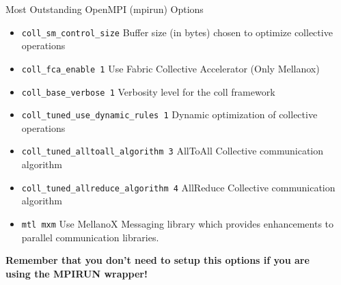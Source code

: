 \documentclass[final,t]{beamer}
\begin{document}
\begin{frame}[fragile]{}
\begin{columns}[t]
\begin{column}{.35\linewidth}
\begin{block}{Most Outstanding OpenMPI (mpirun) Options}
\begin{itemize}
\begin{itemize}
         \item \verb|coll_sm_control_size| Buffer size (in bytes) chosen to optimize collective operations
         \item \verb|coll_fca_enable 1| Use Fabric Collective Accelerator (Only Mellanox)
         \item \verb|coll_base_verbose 1| Verbosity level for the coll framework
         \item \verb|coll_tuned_use_dynamic_rules 1| Dynamic optimization of collective operations
         \item \verb|coll_tuned_alltoall_algorithm 3| AllToAll Collective communication algorithm 
         \item \verb|coll_tuned_allreduce_algorithm 4| AllReduce Collective communication algorithm
         \item \verb|mtl mxm| Use MellanoX Messaging library which provides enhancements to parallel communication libraries.
         \end{itemize}
        \end{itemize}
        \textbf{Remember that you don't need to setup this options if you are using the MPIRUN wrapper!}
      \end{block}




    \end{column}

    
    \begin{column}{.3\linewidth}
    

\end{column}
\end{columns}
\end{frame}
\end{document}
